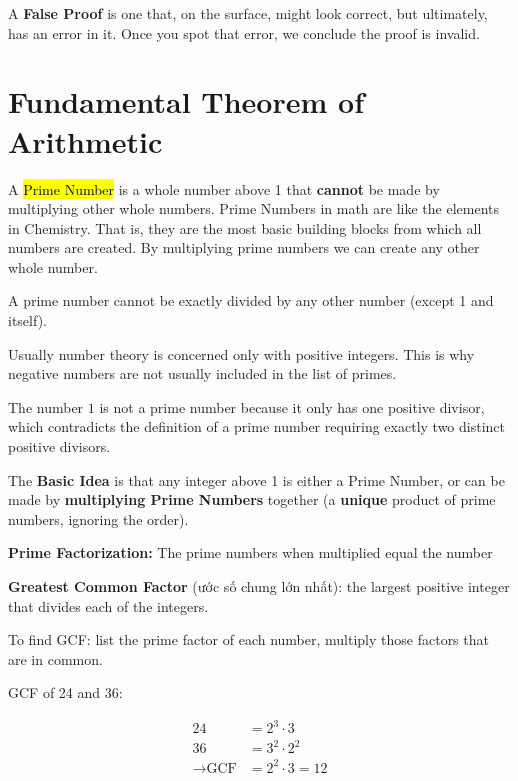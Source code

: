 A \textbf{False Proof} is one that, on the surface, might look correct, but ultimately, has an error in it. Once you spot that error, we conclude the proof is invalid.

\section{Fundamental Theorem of Arithmetic}

A \hl{Prime Number} is a whole number above 1 that \textbf{cannot} be made by multiplying other whole numbers. Prime Numbers in math are like the elements in Chemistry. That is, they are the most basic building blocks from which all numbers are created. By multiplying prime numbers we can create any other whole number.

A prime number cannot be exactly divided by any other number (except 1 and itself).

Usually number theory is concerned only with positive integers. This is why negative numbers are not usually included in the list of primes.

The number \(\text{1}\) is not a prime number because it only has one positive divisor, which contradicts the definition of a prime number requiring exactly two distinct positive divisors. 

\vspace{5 mm}

The \textbf{Basic Idea} is that any integer above 1 is either a Prime Number, or can be made by \textbf{multiplying Prime Numbers} together (a \textbf{unique} product of prime numbers, ignoring the order).

\textbf{Prime Factorization:} The prime numbers when multiplied equal the number

\vspace{10 mm}

\textbf{Greatest Common Factor} (ước số chung lớn nhất): the largest positive integer that divides each of the integers.

To find GCF: list the prime factor of each number, multiply those factors that are in common.

GCF of 24 and 36:

\[
  \begin{aligned}
    24 &= 2^{3} \cdot 3\\
    36 &= 3^{2} \cdot 2^{2}\\
    \rightarrow \text{GCF} &= 2^{2} \cdot 3 = 12
  \end{aligned}\]
\[\]


